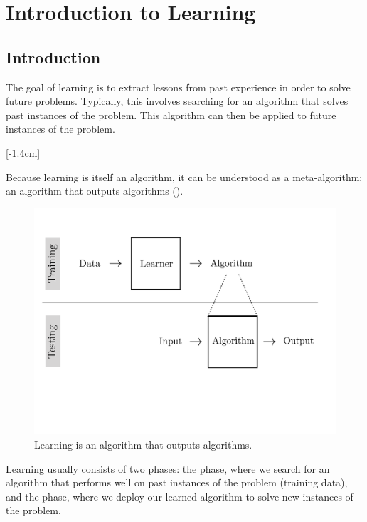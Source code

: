 

\chapter{Introduction to Learning}
\label{chapter:intro_to_learning}

\section{Introduction}
The goal of learning is to extract lessons from past experience in order to solve future problems. Typically, this involves searching for an algorithm that solves past instances of the problem. This algorithm can then be applied to future instances of the problem.

[-1.4cm]

Because learning is itself an algorithm, it can be understood as a meta-algorithm: an algorithm that outputs algorithms (\fig{\ref{fig:learning_as_meta_algorithm}}).

\begin{figure}[h!]
    \centerline{
    \includegraphics[width=0.75\linewidth]{./figures/intro_to_learning/learning_as_meta_algorithm.pdf}
    }
    \caption{Learning is an algorithm that outputs algorithms.}
    \label{fig:learning_as_meta_algorithm}
\end{figure}

Learning usually consists of two phases: the  phase, where we search for an algorithm that performs well on past instances of the problem (training data), and the  phase, where we deploy our learned algorithm to solve new instances of the problem.

